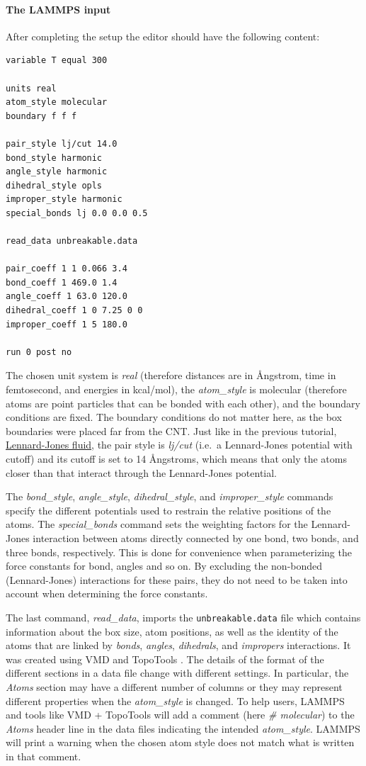 \documentclass[9pt,tutorial]{livecoms}
\newcommand{\flecmd}[1]{\textcolor{command}{\texttt{#1}}} %
\begin{document}
\paragraph{The LAMMPS input}
After completing the setup the editor should have the following content:
\begin{lstlisting}
variable T equal 300

units real
atom_style molecular
boundary f f f

pair_style lj/cut 14.0
bond_style harmonic
angle_style harmonic
dihedral_style opls
improper_style harmonic
special_bonds lj 0.0 0.0 0.5

read_data unbreakable.data

pair_coeff 1 1 0.066 3.4
bond_coeff 1 469.0 1.4
angle_coeff 1 63.0 120.0
dihedral_coeff 1 0 7.25 0 0
improper_coeff 1 5 180.0

run 0 post no
\end{lstlisting}
The chosen unit system is \textit{real} (therefore distances are in
Ångstrom, time in femtosecond, and energies in kcal/mol), the
\textit{atom\_style} is molecular (therefore atoms are point particles
that can be bonded with each other), and the boundary conditions are
fixed.  The boundary conditions do not matter here, as the box
boundaries were placed far from the CNT.  Just like in the previous
tutorial, \hyperref[lennard-jones-label]{Lennard-Jones fluid}, the pair
style is \textit{lj/cut} (i.e.~a Lennard-Jones potential with cutoff)
and its cutoff is set to 14 Ångstroms, which means that only the atoms
closer than that interact through the Lennard-Jones potential.

The \textit{bond\_style}, \textit{angle\_style},
\textit{dihedral\_style}, and \textit{improper\_style} commands specify
the different potentials used to restrain the relative positions of the
atoms.  The \textit{special\_bonds} command sets the weighting factors
for the Lennard-Jones interaction between atoms directly connected by
one bond, two bonds, and three bonds, respectively.  This is done for
convenience when parameterizing the force constants for bond, angles and
so on.  By excluding the non-bonded (Lennard-Jones) interactions for
these pairs, they do not need to be taken into account when determining
the force constants.

The last command, \textit{read\_data}, imports the
\flecmd{unbreakable.data} file which contains information about the box
size, atom positions, as well as the identity of the atoms that are
linked by \textit{bonds}, \textit{angles}, \textit{dihedrals}, and
\textit{impropers} interactions.  It was created using VMD and TopoTools
\cite{kohlmeyer2017topotools}.  The details of the format of the
different sections in a data file change with different settings.  In
particular, the \textit{Atoms} section may have a different number of
columns or they may represent different properties when the
\textit{atom\_style} is changed.  To help users, LAMMPS and tools like
VMD + TopoTools will add a comment (here \textit{\# molecular}) to the
\textit{Atoms} header line in the data files indicating the intended
\textit{atom\_style}.  LAMMPS will print a warning when the chosen atom
style does not match what is written in that comment.
\end{document}
